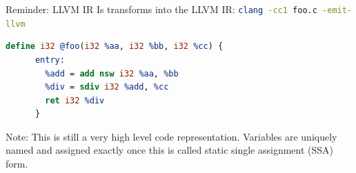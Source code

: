 \documentclass[]{beamer}
\begin{document}
\begin{frame}[fragile]{Reminder: LLVM IR}
  \vfill
  Is transforms into the LLVM IR: \lstinline[language=bash]{clang -cc1 foo.c -emit-llvm}\\
  \begin{lstlisting}[language=LLVM,gobble=4]
    define i32 @foo(i32 %aa, i32 %bb, i32 %cc) {
      entry:
        %add = add nsw i32 %aa, %bb
        %div = sdiv i32 %add, %cc
        ret i32 %div
      }
  \end{lstlisting}
  \vfill
  Note: This is still a very high level code representation. Variables are uniquely named and 
  assigned exactly once this is called static single assignment (SSA) form.
\end{frame}
\end{document}
